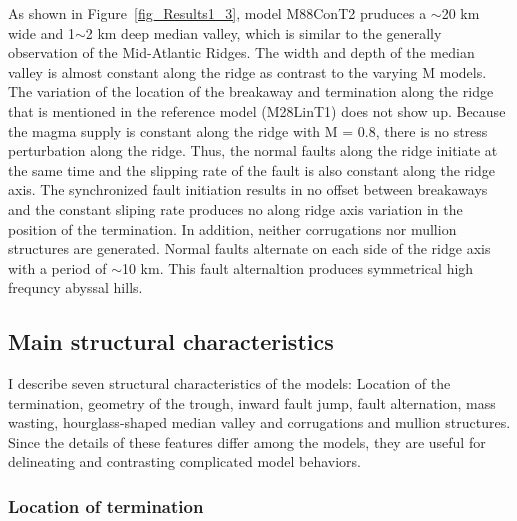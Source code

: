 As shown in Figure~\hyperref[fig_Results1_3]{\ref{fig_Results1_3}}, model M88ConT2 pruduces a $\sim$20 km wide and 1$\sim$2 km deep median valley, which is similar to the generally observation of the Mid-Atlantic Ridges. The width and depth of the median valley is almost constant along the ridge as contrast to the varying M models. The variation of the location of the breakaway and termination along the ridge that is mentioned in the reference model (M28LinT1) does not show up. Because the magma supply is constant along the ridge with M = 0.8, there is no stress perturbation along the ridge. Thus, the normal faults along the ridge initiate at the same time and the slipping rate of the fault is also constant along the ridge axis. The synchronized fault initiation results in no offset between breakaways and the constant sliping rate produces no along ridge axis variation in the position of the termination. In addition, neither corrugations nor mullion structures are generated. Normal faults alternate on each side of the ridge axis with a period of $\sim$10 km. This fault alternaltion produces symmetrical high frequncy abyssal hills.

\subsection{Main structural characteristics}
I describe seven structural characteristics of the models: Location of the termination, geometry of the trough, inward fault jump, fault alternation, mass wasting, hourglass-shaped median valley and corrugations and mullion structures. Since the details of these features differ among the models, they are useful for delineating and contrasting complicated model behaviors.

\subsubsection{Location of termination}

